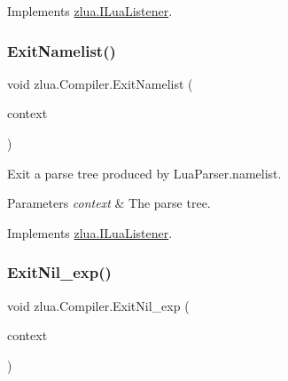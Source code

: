 Implements \mbox{\hyperlink{interfacezlua_1_1_i_lua_listener_a1f6a7b27829eca2db7ed31a06cc3ae38}{zlua.\+I\+Lua\+Listener}}.

\mbox{\label{classzlua_1_1_compiler_ad35fb734ce46c317f3d6005186ff5a11}} 
\subsubsection{\texorpdfstring{Exit\+Namelist()}{ExitNamelist()}}
{\footnotesize\ttfamily void zlua.\+Compiler.\+Exit\+Namelist (\begin{DoxyParamCaption}\item[{\mbox{[}\+Not\+Null\mbox{]} \mbox{\hyperlink{classzlua_1_1_lua_parser_1_1_namelist_context}{Lua\+Parser.\+Namelist\+Context}}}]{context }\end{DoxyParamCaption})}



Exit a parse tree produced by Lua\+Parser.\+namelist. 


\begin{DoxyParams}{Parameters}
{\em context} & The parse tree.\\
\hline
\end{DoxyParams}


Implements \mbox{\hyperlink{interfacezlua_1_1_i_lua_listener_acd614a0aa9df1e1ead1690e7598414df}{zlua.\+I\+Lua\+Listener}}.

\mbox{\label{classzlua_1_1_compiler_a1ec231e95547be0d28e8d1f30f4872ba}} 
\subsubsection{\texorpdfstring{Exit\+Nil\+\_\+exp()}{ExitNil\_exp()}}
{\footnotesize\ttfamily void zlua.\+Compiler.\+Exit\+Nil\+\_\+exp (\begin{DoxyParamCaption}\item[{\mbox{[}\+Not\+Null\mbox{]} \mbox{\hyperlink{classzlua_1_1_lua_parser_1_1_nil__exp_context}{Lua\+Parser.\+Nil\+\_\+exp\+Context}}}]{context }\end{DoxyParamCaption})}



